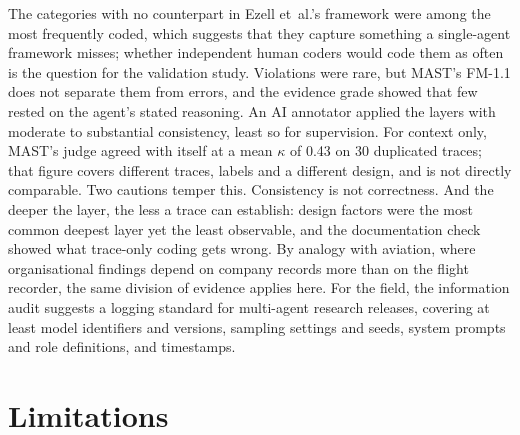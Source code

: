 \documentclass[11pt]{article}
\begin{document}
The categories with no counterpart in Ezell et~al.'s framework were among the most frequently coded, which suggests that they capture something a single-agent framework misses; whether independent human coders would code them as often is the question for the validation study. Violations were rare, but
MAST's FM-1.1 does not separate them from errors, and the evidence grade showed that
few rested on the agent's stated reasoning. An AI annotator applied the layers with moderate to substantial consistency, least so for supervision. For context only, MAST's judge agreed with itself at a mean $\kappa$ of 0.43 on 30 duplicated traces; that figure covers different traces, labels and a different design, and is not directly comparable. Two cautions
temper this. Consistency is not correctness. And the deeper the layer, the less a
trace can establish: design factors were the most common deepest layer yet the
least observable, and the documentation check showed what trace-only coding gets
wrong. By analogy with aviation, where organisational findings depend on company
records more than on the flight recorder, the same division of evidence applies
here. For the field,
the information audit suggests a logging standard for multi-agent research
releases, covering at least model identifiers and versions, sampling settings and
seeds, system prompts and role definitions, and timestamps.

\section{Limitations}
\end{document}
